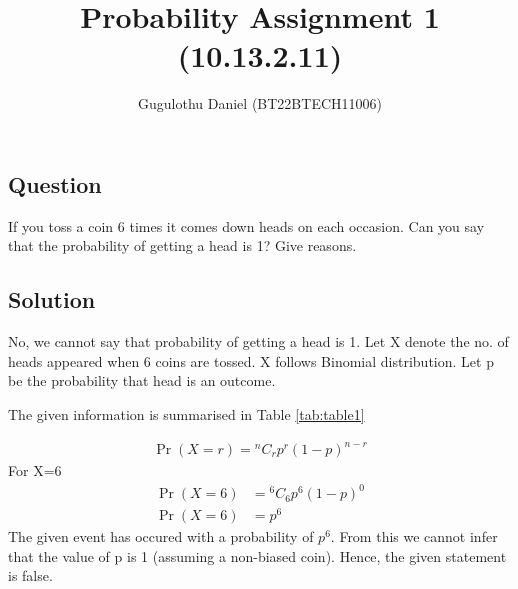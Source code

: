 \documentclass[12pt,onecolumn,notitlepage]{article}
\title{Probability Assignment 1 (10.13.2.11)}
\author{Gugulothu Daniel (BT22BTECH11006)}
\date{}
\newcommand*{\comb}[2]{{}^{#1}C_{#2}}
\begin{document}
	
	\maketitle
	\subsection*{Question}
   If you toss a coin 6 times it comes down heads on each occasion. Can you say that the probability of getting a head is 1? Give reasons.
	
	
	\subsection*{Solution}
	
	No, we cannot say that probability of getting a head is 1.
	Let X denote the no. of heads appeared when 6 coins are tossed. X follows Binomial distribution.
	Let p be the probability that head is an outcome.
	
	The given information is summarised in Table
	\ref{tab:table1}
	\begin{table}[h]\centering
		
		\caption{}
		\label{tab:table1}
	\end{table}	
	
	
	\begin{align}
		\Pr(X=r) = \comb{n}{r}p^r (1-p)^{n-r}
	\end{align}
For X=6
	\begin{align}
		\Pr(X=6) &= \comb{6}{6}p^6 (1-p)^{0} \\
		\Pr(X=6) &= p^6
	\end{align}
The given event has occured with a probability of $p^{6}$. From this we cannot infer that the value of p is 1 (assuming a non-biased coin). 
Hence, the given statement is false.
\end{document}
